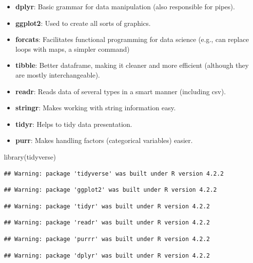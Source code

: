 \documentclass[
]{book}
\newenvironment{Shaded}{\begin{snugshade}}{\end{snugshade}}
\newcommand{\FunctionTok}[1]{\textcolor[rgb]{0.00,0.00,0.00}{#1}}
\newcommand{\NormalTok}[1]{#1}
\begin{document}
\begin{itemize}
\item
  \textbf{dplyr}: Basic grammar for data manipulation (also responsible for pipes).
\item
  \textbf{ggplot2}: Used to create all sorts of graphics.
\item
  \textbf{forcats}: Facilitates functional programming for data science (e.g., can replace loops with maps, a simpler command)
\item
  \textbf{tibble}: Better dataframe, making it cleaner and more efficient (although they are mostly interchangeable).
\item
  \textbf{readr}: Reads data of several types in a smart manner (including csv).
\item
  \textbf{stringr}: Makes working with string information easy.
\item
  \textbf{tidyr}: Helps to tidy data presentation.
\item
  \textbf{purr}: Makes handling factors (categorical variables) easier.
\end{itemize}

\begin{Shaded}
\begin{Highlighting}[]
\FunctionTok{library}\NormalTok{(tidyverse)}
\end{Highlighting}
\end{Shaded}

\begin{verbatim}
## Warning: package 'tidyverse' was built under R version 4.2.2
\end{verbatim}

\begin{verbatim}
## Warning: package 'ggplot2' was built under R version 4.2.2
\end{verbatim}

\begin{verbatim}
## Warning: package 'tidyr' was built under R version 4.2.2
\end{verbatim}

\begin{verbatim}
## Warning: package 'readr' was built under R version 4.2.2
\end{verbatim}

\begin{verbatim}
## Warning: package 'purrr' was built under R version 4.2.2
\end{verbatim}

\begin{verbatim}
## Warning: package 'dplyr' was built under R version 4.2.2
\end{verbatim}
\end{document}
